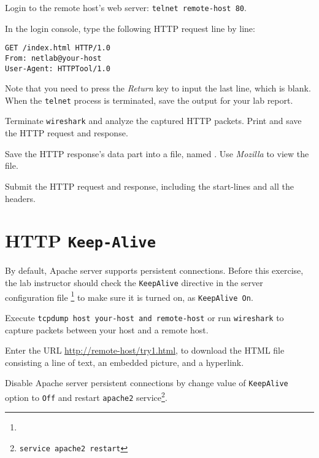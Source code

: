 \documentclass{../UTNetLab}
\begin{document}
    Login to the remote host’s web server: \lstinline[emph={your-host, remote-host}]{telnet remote-host 80}.

    In the login console, type the following HTTP request line by line:
    \begin{lstlisting}[language={HTTP},morekeywords={[2]GET,From,User-Agent},escapechar={},emph={your-host, remote-host}]
GET /index.html HTTP/1.0
From: netlab@your-host
User-Agent: HTTPTool/1.0

    \end{lstlisting}
    Note that you need to press the \textit{Return} key to input the last line, which is blank.
    When the \lstinline{telnet} process is terminated, save the output for your lab report.

    Terminate \lstinline{wireshark} and analyze the captured HTTP packets.
    Print and save the HTTP request and response.

    Save the HTTP response’s data part into a file, named .
    Use \textit{Mozilla} to view the file.
    
    \begin{report}
        \item Submit the HTTP request and response, including the start-lines and all the headers.
    \end{report}

    
\section{HTTP \texttt{Keep-Alive}}
    By default, Apache server supports persistent connections.
    Before this exercise, the lab instructor should check the \texttt{KeepAlive} directive in the server configuration file \footnote{} to make sure it is turned on, as \lstinline[language={HTTP}]{KeepAlive On}.

    Execute \lstinline[emph={your-host, remote-host},morekeywords={[3],host,and}]{tcpdump host your-host and remote-host} or run \lstinline{wireshark} to capture packets between your host and a remote host.

    
    Enter the URL \url{http://remote-host/try1.html}, to download the HTML file consisting a line of text, an embedded picture, and a hyperlink.


    Disable Apache server persistent connections by change value of \texttt{KeepAlive} option to \lstinline{Off} and restart \lstinline{apache2} service\footnote{\lstinline{service apache2 restart}}.
\end{document}
